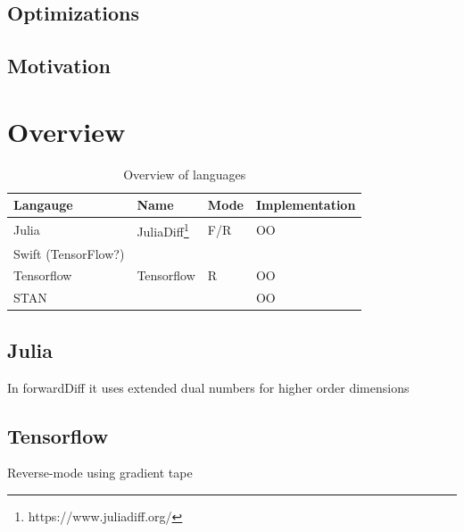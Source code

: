 \subsection{Optimizations}
\subsection{Motivation}


  \section{Overview}
  \begin{table}[H]
    \centering
    \begin{tabular}{l|lll}
      \textbf{Langauge}  & Name & Mode & Implementation  \\ \hline
      Julia                & JuliaDiff\footnote{https://www.juliadiff.org/} &  F/R  & OO \\
      Swift (TensorFlow?)  & &     & \\
      Tensorflow           & Tensorflow   & R  & OO \\
      STAN                 &   &  & OO \\
    \end{tabular}
    \caption{Overview of languages}
    \label{tab:overview}
  \end{table}

\subsection{Julia}
In forwardDiff it uses extended dual numbers for higher order dimensions 



\subsection{Tensorflow}

Reverse-mode using gradient tape





  \newpage
  \nocite{*}
  \printbibliography



